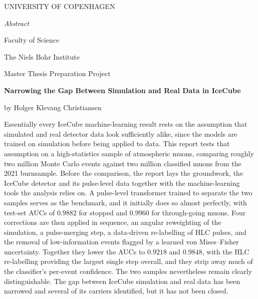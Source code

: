 \begin{center}
    {\Large \textcolor{BrickRed}{UNIVERSITY OF COPENHAGEN}\par}
    \vspace{0.9cm}

    {\Huge\itshape Abstract\par}
    \vspace{0.9cm}

    {\large \textcolor{BrickRed}{Faculty of Science}\par}
    {\large \textcolor{BrickRed}{The Niels Bohr Institute}\par}
    \vspace{0.6cm}

    {\large Master Thesis Preparation Project\par}
    \vspace{0.6cm}

    {\bfseries Narrowing the Gap Between Simulation and Real Data in IceCube\par}
    \vspace{0.3cm}

    by Holger Klevang Christiansen\par
\end{center}
\vspace{0.9cm}

Essentially every IceCube machine-learning result rests on the assumption that
simulated and real detector data look sufficiently alike, since the models are
trained on simulation before being applied to data. This report tests that
assumption on a high-statistics sample of atmospheric muons, comparing roughly
two million Monte Carlo events against two million classified muons from the
2021 burnsample. Before the comparison, the report lays the groundwork, the
IceCube detector and its pulse-level data together with the machine-learning
tools the analysis relies on. A pulse-level transformer trained to
separate the two samples serves as the benchmark, and it initially does so
almost perfectly, with test-set AUCs of $0.9882$ for stopped and $0.9960$ for
through-going muons. Four corrections are then applied in sequence, an angular
reweighting of the simulation, a pulse-merging step, a data-driven re-labelling
of HLC pulses, and the removal of low-information events flagged by a learned
von Mises--Fisher uncertainty. Together they lower the AUCs to $0.9218$ and
$0.9848$, with the HLC re-labelling providing the largest single step overall, and they
strip away much of the classifier's per-event confidence. The two samples
nevertheless remain clearly distinguishable. The gap between IceCube simulation
and real data has been narrowed and several of its carriers identified, but it
has not been closed.
